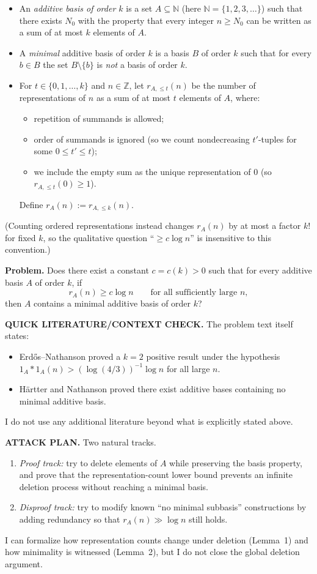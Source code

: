 \begin{itemize}
\item An \emph{additive basis of order $k$} is a set $A\subseteq\mathbb N$ (here $\mathbb N=\{1,2,3,\dots\}$) such that there exists $N_0$ with the property that every integer $n\ge N_0$ can be written as a sum of at most $k$ elements of $A$.
\item A \emph{minimal} additive basis of order $k$ is a basis $B$ of order $k$ such that for every $b\in B$ the set $B\setminus\{b\}$ is \emph{not} a basis of order $k$.
\item For $t\in\{0,1,\dots,k\}$ and $n\in\mathbb Z$, let $r_{A,\le t}(n)$ be the number of representations of $n$ as a sum of at most $t$ elements of $A$, where:
  \begin{itemize}
  \item repetition of summands is allowed;
  \item order of summands is ignored (so we count nondecreasing $t'$-tuples for some $0\le t'\le t$);
  \item we include the empty sum as the unique representation of $0$ (so $r_{A,\le t}(0)\ge 1$).
  \end{itemize}
  Define $r_A(n):=r_{A,\le k}(n)$.
\end{itemize}

(Counting ordered representations instead changes $r_A(n)$ by at most a factor $k!$ for fixed $k$, so the qualitative question ``$\ge c\log n$'' is insensitive to this convention.)

\medskip
\noindent\textbf{Problem.}
Does there exist a constant $c=c(k)>0$ such that for every additive basis $A$ of order $k$, if
\[
 r_A(n)\ge c\log n\qquad\text{for all sufficiently large }n,
\]
then $A$ contains a minimal additive basis of order $k$?

\medskip
\noindent\textbf{QUICK LITERATURE/CONTEXT CHECK.}
The problem text itself states:
\begin{itemize}
\item Erd\H{o}s--Nathanson proved a $k=2$ positive result under the hypothesis $1_A\ast 1_A(n)>(\log(4/3))^{-1}\log n$ for all large $n$.
\item H\"artter and Nathanson proved there exist additive bases containing no minimal additive basis.
\end{itemize}
I do not use any additional literature beyond what is explicitly stated above.

\medskip
\noindent\textbf{ATTACK PLAN.}
Two natural tracks.
\begin{enumerate}
\item \emph{Proof track:} try to delete elements of $A$ while preserving the basis property, and prove that the representation-count lower bound prevents an infinite deletion process without reaching a minimal basis.
\item \emph{Disproof track:} try to modify known ``no minimal subbasis'' constructions by adding redundancy so that $r_A(n)\gg\log n$ still holds.
\end{enumerate}
I can formalize how representation counts change under deletion (Lemma~1) and how minimality is witnessed (Lemma~2), but I do not close the global deletion argument.

